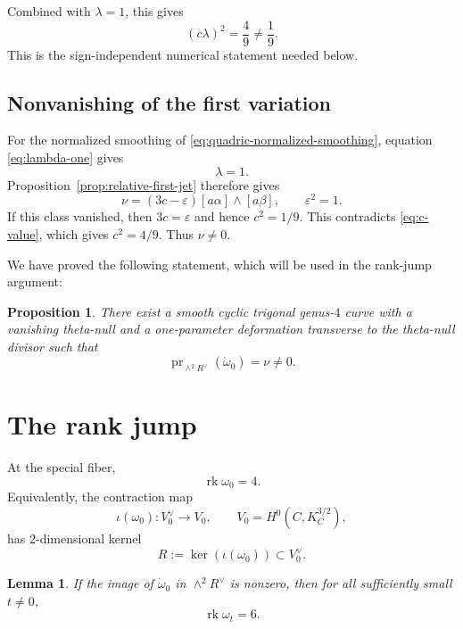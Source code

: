 \documentclass[11pt]{article}
\newtheorem{proposition}[theorem]{Proposition}
\newtheorem{lemma}[theorem]{Lemma}
\newcommand{\rk}{\operatorname{rk}}
\begin{document}
Combined with $\lambda=1$, this gives
\begin{equation}
\label{eq:clambda-value}
{(c\lambda)^2=\frac49\neq\frac19.}
\end{equation}
This is the sign-independent numerical statement needed below.



\subsection{Nonvanishing of the first variation}
\label{subsec:first-variation-nonzero}

For the normalized smoothing of
\eqref{eq:quadric-normalized-smoothing}, equation
\eqref{eq:lambda-one} gives
\[
{\lambda=1.}
\]
Proposition~\ref{prop:relative-first-jet} therefore gives
\begin{equation}
\label{eq:final-first-variation-coefficient}
\nu
=
{(3c-\varepsilon)}
[a\alpha]\wedge[a\beta],
\qquad
\varepsilon^2=1.
\end{equation}
If this class vanished, then {$3c=\varepsilon$ and hence $c^2=1/9$.}  This contradicts \eqref{eq:c-value}, which gives
$c^2=4/9$.  Thus $\nu\neq0$.

We have proved the following statement, which will be used in the rank-jump
argument:
\begin{proposition}
\label{prop:cyclic-first-variation}
There exist a smooth cyclic trigonal genus-$4$ curve with a vanishing
theta-null and a one-parameter deformation transverse to the
theta-null divisor such that
\[
\operatorname{pr}_{\wedge^2R^\vee}(\dot\omega_0)=\nu\neq0.
\]
\end{proposition}


\section{The rank jump}

At the special fiber,
\[
\rk \omega_0=4.
\]
Equivalently, the contraction map
\[
\iota(\omega_0):V_0^\vee \to V_0,
\qquad V_0=H^0(C,K_C^{3/2}),
\]
has $2$-dimensional kernel
\[
R:=\ker(\iota(\omega_0))\subset V_0^\vee.
\]

\begin{lemma}\label{lem:rankjump}
If the image of \(\dot\omega_0\) in \(\wedge^2 R^\vee\) is nonzero, then for all sufficiently small \(t\neq 0\),
\[
\rk \omega_t=6.
\]
\end{lemma}
\end{document}

